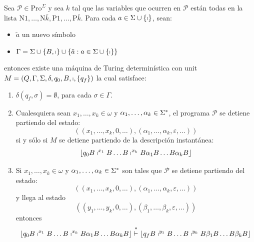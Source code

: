 	\begin{lemma}
		\PN Sea $\mathcal{P} \in \mathrm{Pro}^{\Sigma}$ y sea $k$ tal que las variables que ocurren en $\mathcal{P}$ están
    todas en la lista $\mathrm{N}1, \dotsc, \mathrm{N}\bar{k}, \mathrm{P}1, \dotsc, \mathrm{P}\bar{k}$. Para cada $a \in
    \Sigma \cup \{\shortmid\}$, sean:

    \begin{itemize}
      \item $\tilde{a}$ un nuevo símbolo
      \item $\Gamma = \Sigma \cup \{B, \shortmid\} \cup \{\tilde{a}: a \in \Sigma \cup \{\shortmid\}\}$
    \end{itemize}

    \PN entonces existe una máquina de Turing determinística con unit $M = \left(Q, \Gamma, \Sigma, \delta, q_{0}, B,
    \shortmid, \{q_{f}\}\right)$ la cual satisface:

    \begin{enumerate}
      \item $\delta(q_{f},\sigma) = \emptyset$, para cada $\sigma \in \Gamma$.
      \item Cualesquiera sean $x_{1}, \dotsc, x_{k} \in \omega$ y $\alpha_{1}, \dotsc, \alpha_{k} \in \Sigma^{\ast}$, el
        programa $\mathcal{P}$ se detiene partiendo del estado:
        \[
          \left((x_{1}, \dotsc, x_{k}, 0, \dotsc), (\alpha_{1}, \dotsc, \alpha_{k}, \varepsilon,\dotsc)\right)
        \]
        \PN si y sólo si $M$ se detiene partiendo de la descripción instantánea:
        \[
          \lfloor q_{0} B \shortmid^{x_{1}} B \dotsc B \shortmid^{x_{k}} B \alpha_{1} B \dotsc B \alpha_{k} B \rfloor
        \]

      \item Si $x_{1}, \dotsc, x_{k} \in \omega$ y $\alpha_{1}, \dotsc, \alpha_{k} \in \Sigma^{\ast}$ son tales que
        $\mathcal{P}$ se detiene partiendo del estado:
        \[
          \left((x_{1}, \dotsc, x_{k}, 0, \dotsc), (\alpha_{1}, \dotsc, \alpha_{k}, \varepsilon, \dotsc)\right)
        \]
        \PN y llega al estado
        \[
          \left((y_{1}, \dotsc, y_{k}, 0, \dotsc), (\beta_{1}, \dotsc, \beta_{k}, \varepsilon,\dotsc)\right)
        \]
        \PN entonces
        \[
          \lfloor q_{0} B \shortmid^{x_{1}} B \dotsc B \shortmid^{x_{k}} B \alpha_{1} B \dotsc B \alpha_{k} B \rfloor
          \overset {\ast}{\vdash} \lfloor q_{f} B \shortmid^{y_{1}} B \dotsc B \shortmid^{y_{k}} B \beta_{1} B \dotsc B
          \beta_{k} B \rfloor
        \]
    \end{enumerate}
  \end{lemma}
